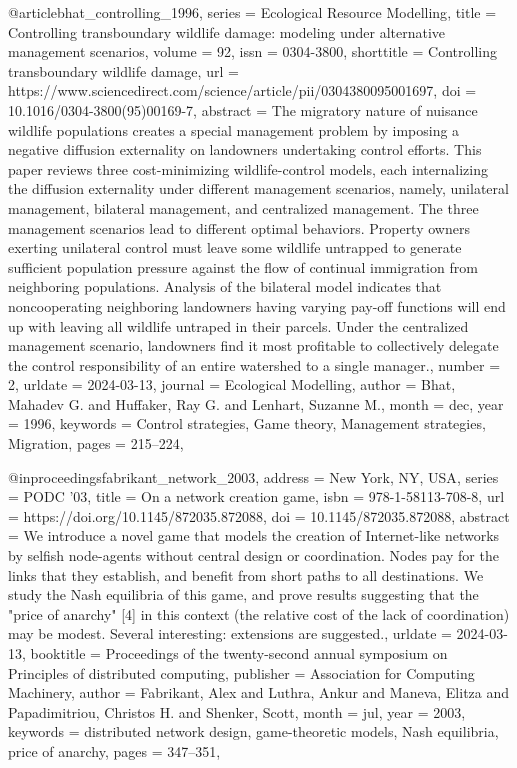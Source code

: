 {{{{@article{bhat_controlling_1996,
	series = {Ecological {Resource} {Modelling}},
	title = {Controlling transboundary wildlife damage: modeling under alternative management scenarios},
	volume = {92},
	issn = {0304-3800},
	shorttitle = {Controlling transboundary wildlife damage},
	url = {https://www.sciencedirect.com/science/article/pii/0304380095001697},
	doi = {10.1016/0304-3800(95)00169-7},
	abstract = {The migratory nature of nuisance wildlife populations creates a special management problem by imposing a negative diffusion externality on landowners undertaking control efforts. This paper reviews three cost-minimizing wildlife-control models, each internalizing the diffusion externality under different management scenarios, namely, unilateral management, bilateral management, and centralized management. The three management scenarios lead to different optimal behaviors. Property owners exerting unilateral control must leave some wildlife untrapped to generate sufficient population pressure against the flow of continual immigration from neighboring populations. Analysis of the bilateral model indicates that noncooperating neighboring landowners having varying pay-off functions will end up with leaving all wildlife untraped in their parcels. Under the centralized management scenario, landowners find it most profitable to collectively delegate the control responsibility of an entire watershed to a single manager.},
	number = {2},
	urldate = {2024-03-13},
	journal = {Ecological Modelling},
	author = {Bhat, Mahadev G. and Huffaker, Ray G. and Lenhart, Suzanne M.},
	month = dec,
	year = {1996},
	keywords = {Control strategies, Game theory, Management strategies, Migration},
	pages = {215--224},
}

@inproceedings{fabrikant_network_2003,
	address = {New York, NY, USA},
	series = {{PODC} '03},
	title = {On a network creation game},
	isbn = {978-1-58113-708-8},
	url = {https://doi.org/10.1145/872035.872088},
	doi = {10.1145/872035.872088},
	abstract = {We introduce a novel game that models the creation of Internet-like networks by selfish node-agents without central design or coordination. Nodes pay for the links that they establish, and benefit from short paths to all destinations. We study the Nash equilibria of this game, and prove results suggesting that the "price of anarchy" [4] in this context (the relative cost of the lack of coordination) may be modest. Several interesting: extensions are suggested.},
	urldate = {2024-03-13},
	booktitle = {Proceedings of the twenty-second annual symposium on {Principles} of distributed computing},
	publisher = {Association for Computing Machinery},
	author = {Fabrikant, Alex and Luthra, Ankur and Maneva, Elitza and Papadimitriou, Christos H. and Shenker, Scott},
	month = jul,
	year = {2003},
	keywords = {distributed network design, game-theoretic models, Nash equilibria, price of anarchy},
	pages = {347--351},
}

}}}}
